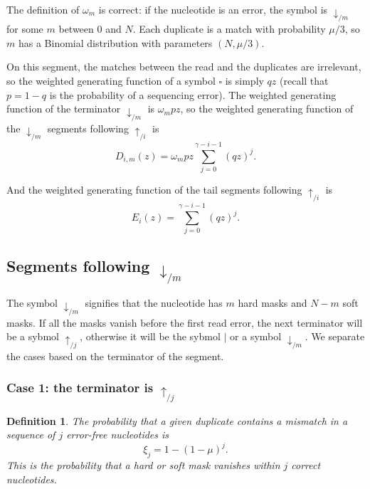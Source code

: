 \documentclass{article}
\newtheorem{definition}{Definition}
\begin{document}
The definition of $\omega_m$ is correct: if the nucleotide is an error,
the symbol is $\downarrow_{/m}$ for some $m$ between 0 and $N$. Each
duplicate is a match with probability $\mu/3$, so $m$ has a Binomial
distribution with parameters $(N, \mu/3)$.

On this segment, the matches between the read and the duplicates are
irrelevant, so the weighted generating function of a symbol $\square$ is
simply $qz$ (recall that $p = 1-q$ is the probability of a sequencing
error). The weighted generating function of the terminator
$\downarrow_{/m}$ is $\omega_m pz$, so the weighted generating function of
the $\downarrow_{/m}$ segments following $\uparrow_{/i}$ is
\begin{equation}
\label{eq:D}
D_{i,m}(z) = \omega_m pz \sum_{j=0}^{\gamma-i-1} (qz)^j.
\end{equation}

And the weighted generating function of the tail segments following
$\uparrow_{/i}$ is
\begin{equation}
\label{eq:E}
E_i(z) = \sum_{j=0}^{\gamma-i-1} (qz)^j.
\end{equation}


\subsection{Segments following $\downarrow_{/m}$}

The symbol $\downarrow_{/m}$ signifies that the nucleotide has $m$ hard
masks and $N-m$ soft masks. If all the masks vanish before the first read
error, the next terminator will be a sybmol $\uparrow_{/j}$, otherwise it
will be the sybmol $|$ or a symbol $\downarrow_{/m}$. We separate the
cases based on the terminator of the segment.

\subsubsection*{Case 1: the terminator is $\uparrow_{/j}$}

\begin{definition}
The probability that a given duplicate contains a mismatch in a sequence
of $j$ error-free nucleotides is
\begin{equation}
\label{eq:xi}
\xi_j = 1-(1-\mu)^j.
\end{equation}
This is the probability that a hard or soft mask vanishes within $j$
correct nucleotides.
\end{definition}
\end{document}
